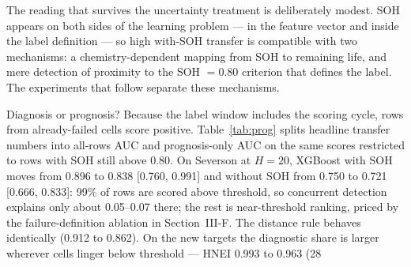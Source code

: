 \documentclass[preprint,12pt]{elsarticle}
\begin{document}
The reading that survives the uncertainty treatment is deliberately modest. SOH appears on both sides of the learning problem --- in the feature vector and inside the label definition --- so high with-SOH transfer is compatible with two mechanisms: a chemistry-dependent mapping from SOH to remaining life, and mere detection of proximity to the SOH $=0.80$ criterion that defines the label. The experiments that follow separate these mechanisms.

Diagnosis or prognosis? Because the label window includes the scoring cycle, rows from already-failed cells score positive. Table~\ref{tab:prog} splits headline transfer numbers into all-rows AUC and prognosis-only AUC on the same scores restricted to rows with SOH still above 0.80. On Severson at $H{=}20$, XGBoost with SOH moves from 0.896 to 0.838 [0.760, 0.991] and without SOH from 0.750 to 0.721 [0.666, 0.833]: 99\% of rows are scored above threshold, so concurrent detection explains only about 0.05--0.07 there; the rest is near-threshold ranking, priced by the failure-definition ablation in Section~III-F. The distance rule behaves identically (0.912 to 0.862). On the new targets the diagnostic share is larger wherever cells linger below threshold --- HNEI 0.993 to 0.963 (28%
\end{document}
